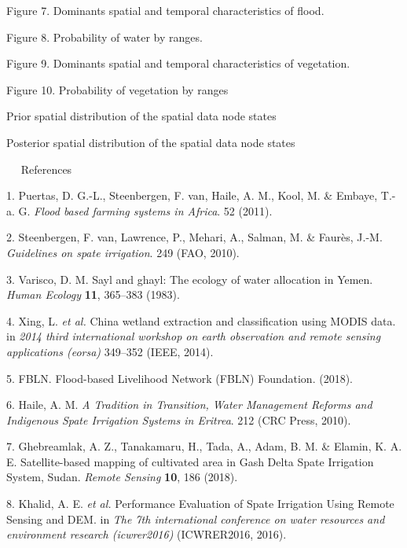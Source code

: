 \documentclass[12pt,oneside]{article}
\begin{document}
Figure 7. Dominants spatial and temporal characteristics of flood.

Figure 8. Probability of water by ranges.

Figure 9. Dominants spatial and temporal characteristics of vegetation.

Figure 10. Probability of vegetation by ranges

Prior spatial distribution of the spatial data node states

Posterior spatial distribution of the spatial data node states

  References

\hypertarget{refs}{}
\leavevmode\hypertarget{ref-Puertas_et_al_2011}{}%
1. Puertas, D. G.-L., Steenbergen, F. van, Haile, A. M., Kool, M. \&
Embaye, T.-a. G. \emph{Flood based farming systems in Africa}. 52
(2011).

\leavevmode\hypertarget{ref-VanSteenbergen_et_al_2010}{}%
2. Steenbergen, F. van, Lawrence, P., Mehari, A., Salman, M. \& Faurès,
J.-M. \emph{Guidelines on spate irrigation}. 249 (FAO, 2010).

\leavevmode\hypertarget{ref-Varisco_1983}{}%
3. Varisco, D. M. Sayl and ghayl: The ecology of water allocation in
Yemen. \emph{Human Ecology} \textbf{11}, 365--383 (1983).

\leavevmode\hypertarget{ref-Xing_et_al_2014}{}%
4. Xing, L. \emph{et al.} China wetland extraction and classification
using MODIS data. in \emph{2014 third international workshop on earth
observation and remote sensing applications (eorsa)} 349--352 (IEEE,
2014).

\leavevmode\hypertarget{ref-FBLN_2018}{}%
5. FBLN. Flood-based Livelihood Network (FBLN) Foundation. (2018).

\leavevmode\hypertarget{ref-Haile_2010}{}%
6. Haile, A. M. \emph{A Tradition in Transition, Water Management
Reforms and Indigenous Spate Irrigation Systems in Eritrea}. 212 (CRC
Press, 2010).

\leavevmode\hypertarget{ref-Ghebreamlak_et_al_2018}{}%
7. Ghebreamlak, A. Z., Tanakamaru, H., Tada, A., Adam, B. M. \& Elamin,
K. A. E. Satellite-based mapping of cultivated area in Gash Delta Spate
Irrigation System, Sudan. \emph{Remote Sensing} \textbf{10}, 186 (2018).

\leavevmode\hypertarget{ref-Khalid_et_al_2016}{}%
8. Khalid, A. E. \emph{et al.} Performance Evaluation of Spate
Irrigation Using Remote Sensing and DEM. in \emph{The 7th international
conference on water resources and environment research (icwrer2016)}
(ICWRER2016, 2016).
\end{document}
